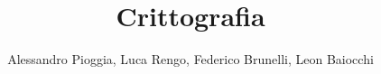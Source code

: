 \documentclass[a4paper,12pt]{report}
\title{\textbf{Crittografia}}
\author{Alessandro Pioggia, Luca Rengo, Federico Brunelli, Leon Baiocchi}
\begin{document}
	\makeatletter
	\begin{titlepage}
		\begin{center}
			{\Huge  \@title }\\[3ex] 
			{\large  \@author}\\[3ex] 
			{\large \@date}
		\end{center}
	\end{titlepage}
	\makeatother
	\thispagestyle{empty}
	\newpage
	
	
	\tableofcontents
	
	
	
	\newpage
	
	
	
	
	
	
	
	
	
	
	
	
	
	
	
	
	
	
	
	
	
	
	
	
	
	
	
\end{document}
